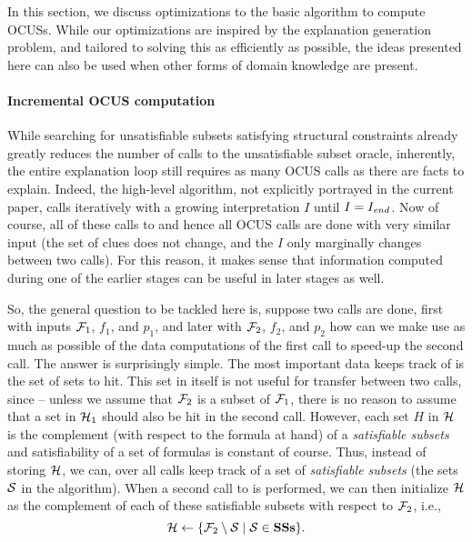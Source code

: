 In this section, we discuss optimizations to the basic algorithm to compute OCUSs. 
While our optimizations are inspired by the explanation generation problem, and tailored to solving this as efficiently as possible, the ideas presented here can also be used when other forms of domain knowledge are present.  


\paragraph{Incremental OCUS computation}
While searching for unsatisfiable subsets satisfying structural constraints already greatly reduces the number of calls to the unsatisfiable subset oracle, inherently, the entire explanation loop still requires as many OCUS calls as there are facts to explain. 
Indeed, the high-level algorithm, not explicitly portrayed in the current paper, calls \onestepo iteratively with a  growing  interpretation $I$ until $I=I_\mathit{end} $.
Now of course, all of these calls to \onestepo and hence all OCUS calls are done with very similar input (the set of clues does not change, and the $I$ only marginally changes between two calls). For this reason, it makes sense that information computed during one of the earlier stages can be useful in later stages as well. 

So, the general question to be tackled here is, suppose two \comus calls are done, first with inputs $\mathcal{F} _1$, $f_1$, and $p_1$, and later with $\mathcal{F} _2$, $f_2$, and $p_2$ how can we make use as much as possible of the data computations of the first call to speed-up the second call. The answer is surprisingly simple. The most important data \comus keeps track of  is the set \setstohit of sets to hit.  This set in itself is not useful for transfer between two calls, since -- unless we assume that $\mathcal{F} _2$ is a subset of $\mathcal{F} _1$, there is no reason to assume that a set in $\mathcal{H} _1$ should also be hit in the second call. 
However, each set $H$ in $\mathcal{H} $ is the complement (with respect to the formula at hand) of a \emph{satisfiable subsets} and satisfiability of a set of formulas is constant of course. 
Thus, instead of storing $\mathcal{H} $, we can, over all calls keep track of a set \satsets of \emph{satisfiable subsets} (the sets $\mathcal{S}$ in the \comus algorithm). 
When a second call to \comus is performed, we can then initialize $\mathcal{H} $ as the complement of each of these satisfiable subsets with respect to $\mathcal{F} _2$, i.e., \[\mathcal{H} \gets \{\mathcal{F} _2\setminus \mathcal{S}\mid \mathcal{S}\in \mathbf{SSs}\}.\]


